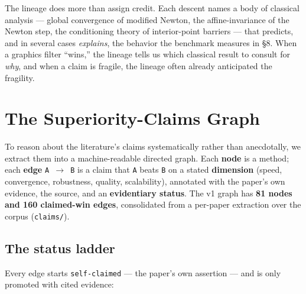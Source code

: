 \documentclass{egpubl}
\begin{document}
The lineage does more than assign credit. Each descent names a body of classical analysis --- global
convergence of modified Newton, the affine-invariance of the Newton step, the conditioning theory of
interior-point barriers --- that predicts, and in several cases \emph{explains}, the behavior the benchmark
measures in \S8. When a graphics filter ``wins,'' the lineage tells us which classical result to consult
for \emph{why}, and when a claim is fragile, the lineage often already anticipated the fragility.


\section{The Superiority-Claims Graph}

To reason about the literature's claims systematically rather than anecdotally, we extract them into a
machine-readable directed graph. Each \textbf{node} is a method; each \textbf{edge} \texttt{A $\rightarrow$ B} is a claim that \texttt{A}
beats \texttt{B} on a stated \textbf{dimension} (speed, convergence, robustness, quality, scalability), annotated
with the paper's own evidence, the source, and an \textbf{evidentiary status}. The v1 graph has \textbf{81 nodes
and 160 claimed-win edges}, consolidated from a per-paper extraction over the corpus (\texttt{claims/}).

\subsection{The status ladder}

Every edge starts \texttt{self-claimed} --- the paper's own assertion --- and is only promoted with cited
evidence:
\end{document}
